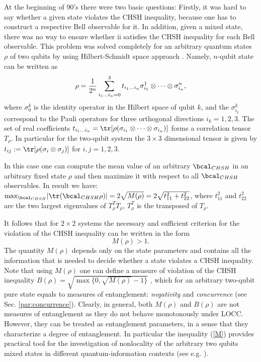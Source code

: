\documentclass[twocolumn,aps,rmp]{revtex4}
\begin{document}
At the beginning of 90's there were two basic questions: Firstly, it
was hard to say whether a given state violates the CHSH inequality,
because one has to construct a respective Bell observable for it. In
addition, given a mixed state, there was no way to ensure whether ii
satisfies the CHSH inequality for each Bell observable.  This problem
was solved completely for an arbitrary quantum states $\rho $ of two
qubits by using Hilbert-Schmidt space approach \cite
{HHH1995-bell}. Namely, $n$-qubit state can be written as
\begin{equation}
\rho
={1\over 2^n}\sum^3_{i_1...i_n=0}t_{i_1...i_n} \sigma^1_{i_1}\otimes
\cdots\otimes \sigma^n_{i_n}, \label{stan}
\end{equation}
where $\sigma _0^k$ is the identity operator in the Hilbert space of
qubit $k$, and the $\sigma_{i_k}^k$ correspond to the Pauli operators
for three orthogonal directions $i_k=1,2,3$. The set of real
coefficients $t_{i_1...i_n}= {\tr}[\rho (\sigma _{i_1}\otimes
\cdots\otimes \sigma _{i_n})]$ forms a correlation tensor $T_\rho$. In
particular for the two-qubit system the $3\times 3$ dimensional tensor
is given by $t_{ij}:={\tr}[ \rho (\sigma_{i} \otimes \sigma_{j})]$ for
$i,j=1,2,3$.

In this case one can compute the mean value of an arbitrary
$\bcal_{CHSH}$ in an arbitrary fixed state $\rho$ and then maximize
it with respect to all $\bcal_{CHSH}$ observables. In result we
have: ${\max}_{\bcal_{CHSH}}|{\tr}(\bcal_{CHSH}\rho )|=
2\sqrt{M(\rho)}=2\sqrt{t^2_{11} +t^2_{22}}$, where  $t^2_{11}$ and
$t^2_{22}$ are the two largest eigenvalues of $T^T_\rho T_\rho $,
$T^T_\rho $ is the transposed of $T_\rho $.

It follows that for $2\times2$ systems the necessary and sufficient
criterion for the violation of the CHSH inequality can be written in
the form
\begin{equation}
 M(\rho )> 1. \label{M}
\end{equation}
The quantity $M(\rho )$ depends only on the state parameters and
contains all the information that is needed to decide whether a state
violates a CHSH inequality. Note that using $M(\rho )$ one can define
a measure of violation of the CHSH inequality $B(\rho )=\sqrt
{\max\{0,\sqrt{M(\rho )}-1\}}$ \cite {Miranowicz}, which for an
arbitrary two-qubit pure state equals to measures of entanglement:
{\it negativity} and {\it concurrence} (see Sec. \ref{par:concurrence}).
Clearly, in general, both $M(\rho )$ and $B(\rho )$ are not measures
of entanglement as they do not behave monotonously under LOCC.
However, they can be treated as entanglement parameters, in a sense
that they characterize a degree of entanglement. In particular the
inequality (\ref{M}) provides practical tool for the investigation of
nonlocality of the arbitrary two qubits mixed states in different
quantum-information contexts (see e.g. \cite{Z,Scarani1,Hyllus}).
\end{document}
